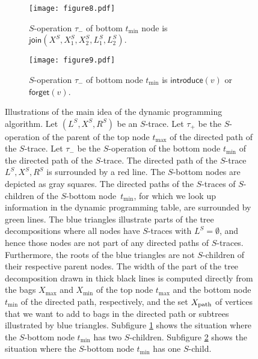 \documentclass[a4paper,UKenglish,cleveref, autoref, thm-restate, numberwithinsect]{lipics-v2021}
\newcounter{algorithm}
\newcommand{\introduce}{\mathsf{introduce}}
\newcommand{\forget}{\mathsf{forget}}
\newcommand{\join}{\mathsf{join}}
\newcommand{\dpath}{\textup{path}}
\begin{document}
\begin{figure}[t]
\centering
\begin{subfigure}[t]{0.64\textwidth}
\centering
\texttt{[image: figure8.pdf]}
\caption{$S$-operation $\tau_-$ of bottom $t_{\min}$ node is $\join(X^S,X_1^S,X_2^S,L_1^S,L_2^S)$.}\label{fig:pathsa}
\end{subfigure}
\begin{subfigure}[t]{0.34\textwidth}
\centering
\texttt{[image: figure9.pdf]}
\caption{$S$-operation $\tau_-$ of bottom node $t_{\min}$ is $\introduce(v)$ or $\forget(v)$.}\label{fig:pathsb}
\end{subfigure}
\caption{Illustrations of the main idea of the dynamic programming algorithm. Let $(L^S, X^S, R^S)$ be an $S$-trace. Let $\tau_+$ be the $S$-operation of the parent of the top node $t_{\max}$ of the directed path of the $S$-trace. Let $\tau_-$ be the $S$-operation of the bottom node $t_{\min}$ of the directed path of the $S$-trace. The directed path of the $S$-trace $L^S, X^S, R^S$ is surrounded by a red line. The $S$-bottom nodes are depicted as gray squares. The directed paths of the $S$-traces of $S$-children of the $S$-bottom node~$t_{\min}$, for which we look up information in the dynamic programming table, are surrounded by green lines. The blue triangles illustrate parts of the tree decompositions where all nodes have $S$-traces with $L^S=\emptyset$, and hence those nodes are not part of any directed paths of $S$-traces. Furthermore, the roots of the blue triangles are not $S$-children of their respective parent nodes. The width of the part of the tree decomposition drawn in thick black lines is computed directly from the bags $X_{\max}$ and $X_{\min}$ of the top node $t_{\max}$ and the bottom node $t_{\min}$ of the directed path, respectively, and the set $X_{\dpath}$ of vertices that we want to add to bags in the directed path or subtrees illustrated by blue triangles. Subfigure \ref{fig:pathsa} shows the situation where the $S$-bottom node $t_{\min}$ has two $S$-children. Subfigure \ref{fig:pathsb} shows the situation where the $S$-bottom node $t_{\min}$ has one $S$-child. }\label{fig:paths}
\end{figure}
\end{document}
